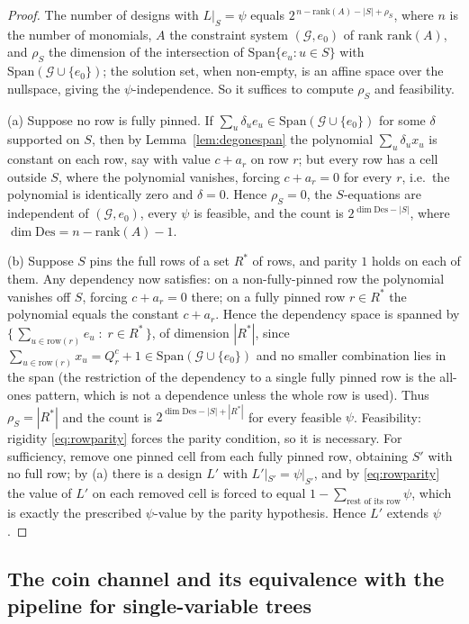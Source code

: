 \documentclass[11pt]{article}
\theoremstyle{definition}
\theoremstyle{remark}
\newcommand{\Des}{\mathrm{Des}}
\newcommand{\Sp}{\mathrm{Span}}
\begin{document}
\begin{proof}
The number of designs with $L|_S=\psi$ equals
$2^{\,n-\mathrm{rank}(A)-|S|+\rho_S}$, where $n$ is the number of
monomials, $A$ the constraint system $(\mathcal{G},e_0)$ of rank
$\mathrm{rank}(A)$, and $\rho_S$ the dimension of the intersection of
$\Sp\{e_u:u\in S\}$ with $\Sp(\mathcal{G}\cup\{e_0\})$; the solution set,
when non-empty, is an affine space over the nullspace, giving the
$\psi$-independence.  So it suffices to compute $\rho_S$ and feasibility.

(a) Suppose no row is fully pinned.  If
$\sum_u\delta_ue_u\in\Sp(\mathcal{G}\cup\{e_0\})$ for some $\delta$
supported on $S$, then by Lemma~\ref{lem:degonespan} the polynomial
$\sum_u\delta_ux_u$ is constant on each row, say with value $c+a_r$ on
row $r$; but every row has a cell outside $S$, where the polynomial
vanishes, forcing $c+a_r=0$ for every $r$, i.e.\ the polynomial is
identically zero and $\delta=0$.  Hence $\rho_S=0$, the $S$-equations
are independent of $(\mathcal{G},e_0)$, every $\psi$ is feasible, and
the count is $2^{\dim\Des-|S|}$, where
$\dim\Des=n-\mathrm{rank}(A)-1$.

(b) Suppose $S$ pins the full rows of a set $R^{\ast}$ of rows, and
parity $1$ holds on each of them.  Any dependency now satisfies: on a
non-fully-pinned row the polynomial vanishes off $S$, forcing
$c+a_r=0$ there; on a fully pinned row $r\in R^{\ast}$ the polynomial
equals the constant $c+a_r$.  Hence the dependency space is spanned by
$\{\,\sum_{u\in\mathrm{row}(r)}e_u \;:\; r\in R^{\ast}\,\}$, of
dimension $|R^{\ast}|$, since $\sum_{u\in\mathrm{row}(r)}x_{u}
=Q^c_r+1\in\Sp(\mathcal{G}\cup\{e_0\})$ and no smaller combination lies
in the span (the restriction of the dependency to a single fully pinned
row is the all-ones pattern, which is not a dependence unless the whole
row is used).  Thus
$\rho_S=|R^{\ast}|$ and the count is
$2^{\dim\Des-|S|+|R^{\ast}|}$ for every feasible $\psi$.  Feasibility:
rigidity \eqref{eq:rowparity} forces the parity condition, so it is
necessary.  For sufficiency, remove one pinned cell from each fully
pinned row, obtaining $S'$ with no full row; by (a) there is a design
$L'$ with $L'|_{S'}=\psi|_{S'}$, and by \eqref{eq:rowparity} the value
of $L'$ on each removed cell is forced to equal
$1-\sum_{\text{rest of its row}}\psi$, which is exactly the prescribed
$\psi$-value by the parity hypothesis.  Hence $L'$ extends $\psi$.
\end{proof}

\subsection{The coin channel and its equivalence with the pipeline for
single-variable trees}
\end{document}
